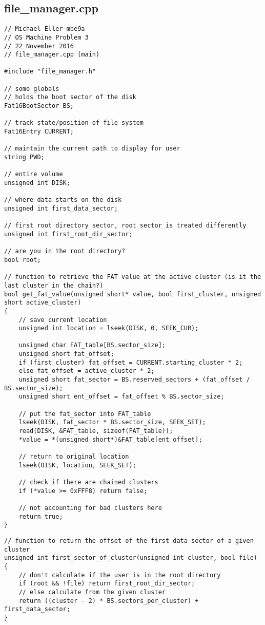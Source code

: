 \documentclass[12pt,letter,titlepage]{article}
\begin{document}
\subsection*{file\_manager.cpp}{
\scriptsize{
\begin{verbatim}
// Michael Eller mbe9a
// OS Machine Problem 3
// 22 November 2016
// file_manager.cpp (main)

#include "file_manager.h"

// some globals
// holds the boot sector of the disk
Fat16BootSector BS;

// track state/position of file system
Fat16Entry CURRENT;

// maintain the current path to display for user
string PWD;

// entire volume
unsigned int DISK;

// where data starts on the disk
unsigned int first_data_sector;

// first root directory sector, root sector is treated differently
unsigned int first_root_dir_sector;

// are you in the root directory?
bool root;

// function to retrieve the FAT value at the active cluster (is it the last cluster in the chain?)
bool get_fat_value(unsigned short* value, bool first_cluster, unsigned short active_cluster)
{
	// save current location
	unsigned int location = lseek(DISK, 0, SEEK_CUR);

	unsigned char FAT_table[BS.sector_size];
	unsigned short fat_offset;
	if (first_cluster) fat_offset = CURRENT.starting_cluster * 2;
	else fat_offset = active_cluster * 2;
	unsigned short fat_sector = BS.reserved_sectors + (fat_offset / BS.sector_size);
	unsigned short ent_offset = fat_offset % BS.sector_size;

	// put the fat_sector into FAT_table
	lseek(DISK, fat_sector * BS.sector_size, SEEK_SET);
	read(DISK, &FAT_table, sizeof(FAT_table));
	*value = *(unsigned short*)&FAT_table[ent_offset];

	// return to original location
	lseek(DISK, location, SEEK_SET);

	// check if there are chained clusters
	if (*value >= 0xFFF8) return false;

	// not accounting for bad clusters here
	return true;
}
\end{verbatim}
\pagebreak
\begin{verbatim}
// function to return the offset of the first data sector of a given cluster
unsigned int first_sector_of_cluster(unsigned int cluster, bool file)
{
	// don't calculate if the user is in the root directory
	if (root && !file) return first_root_dir_sector;
	// else calculate from the given cluster
	return ((cluster - 2) * BS.sectors_per_cluster) + first_data_sector;
}


\end{verbatim}}}
\end{document}
